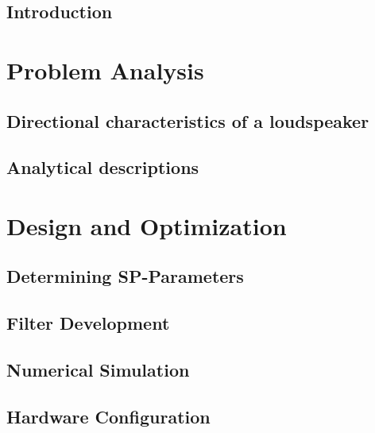 \glsresetall
 \graphicspath{{figures/analysing/}}
\chapter{Introduction}\label{ch:intro}

\part{Problem Analysis}\label{pt:analysis} \glsresetall
 \graphicspath{{figures/analysing/}}
	\chapter{Directional characteristics of a loudspeaker}\label{ch:directional}
		
		
	\chapter{Analytical descriptions}\label{ch:analytical}
		

		

	



\part{Design and Optimization}\label{pt:design} 
\graphicspath{{figures/design/}}	
\chapter{Determining SP-Parameters}\label{ch:optimization}
	 		
\chapter{Filter Development}
	
\chapter{Numerical Simulation}\label{ch:numerical} 
	  
	 
\chapter{Hardware Configuration}
	 

